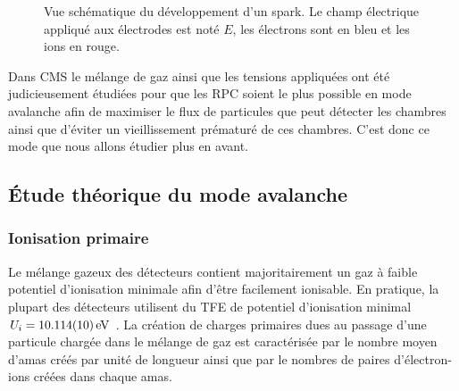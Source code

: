 \begin{figure}[ht!]
    \hfill
	\caption{Vue schématique du développement d'un spark. Le champ électrique appliqué aux électrodes est noté $E$, les électrons sont en bleu et les ions en rouge.}
	\label{spark}
\end{figure}


Dans CMS le mélange de gaz ainsi que les tensions appliquées ont été judicieusement étudiées pour que les RPC soient le plus possible en mode avalanche afin de maximiser le flux de particules que peut détecter les chambres ainsi que d'éviter un vieillissement prématuré de ces chambres. C'est donc ce mode que nous allons étudier plus en avant.

\subsection{Étude théorique du mode avalanche}

\subsubsection{Ionisation primaire}
Le mélange gazeux des détecteurs contient majoritairement un gaz à faible potentiel d'ionisation minimale afin d'être facilement ionisable. En pratique, la plupart des détecteurs utilisent du TFE de potentiel d'ionisation minimal $U_{i}=\SI{10.114 \pm0.010}{\eV}$ \cite{Chimie:chimie}. La création de charges primaires dues au passage d'une particule chargée dans le mélange de gaz est caractérisée par le nombre moyen d'amas créés par unité de longueur ainsi que par le nombres de paires d'électron-ions créées dans chaque amas.

